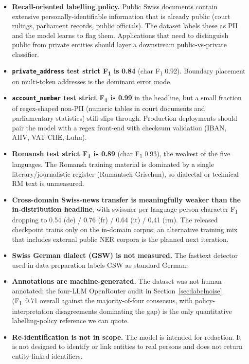 \documentclass[sigconf,nonacm]{acmart}
\begin{document}
\begin{itemize}
  \item \textbf{Recall-oriented labelling policy.} Public Swiss documents
        contain extensive personally-identifiable information that is
        already public (court rulings, parliament records, public
        officials). The dataset labels these as PII and the model
        learns to flag them. Applications that need to distinguish
        public from private entities should layer a downstream
        public-vs-private classifier.
  \item \textbf{\texttt{private\_address} test strict F\textsubscript{1}
        is 0.84} (char F\textsubscript{1} 0.92). Boundary placement
        on multi-token addresses is the dominant error mode.
  \item \textbf{\texttt{account\_number} test strict F\textsubscript{1}
        is 0.99} in the headline, but a small fraction of regex-shaped
        non-PII (numeric tables in court documents and parliamentary
        statistics) still slips through. Production deployments
        should pair the model with a regex front-end with checksum
        validation (IBAN, AHV, VAT-CHE, Luhn).
  \item \textbf{Romansh test strict F\textsubscript{1} is 0.89}
        (char F\textsubscript{1} 0.93), the weakest of the five
        languages. The Romansh training material is dominated by a
        single literary/journalistic register (Rumantsch Grischun),
        so dialectal or technical RM text is unmeasured.
  \item \textbf{Cross-domain Swiss-news transfer is meaningfully
        weaker than the in-distribution headline}, with
        \textsf{swissner} per-language person-character
        F\textsubscript{1} dropping to 0.54 (de) / 0.76 (fr) /
        0.64 (it) / 0.41 (rm). The released checkpoint trains
        only on the in-domain corpus; an alternative training mix
        that includes external public NER corpora is the planned
        next iteration.
  \item \textbf{Swiss German dialect (GSW) is not measured.} The
        fasttext detector used in data preparation labels GSW as
        standard German.
  \item \textbf{Annotations are machine-generated.} The dataset
        was not human-annotated; the four-LLM OpenRouter audit in
        Section~\ref{sec:labelnoise} (F\textsubscript{1}~0.71
        overall against the majority-of-four consensus, with
        policy-interpretation disagreements dominating the gap)
        is the only quantitative labelling-policy reference we
        can quote.
  \item \textbf{Re-identification is not in scope.} The model is
        intended for redaction. It is not designed to identify or
        link entities to real persons and does not return
        entity-linked identifiers.
\end{itemize}
\end{document}
